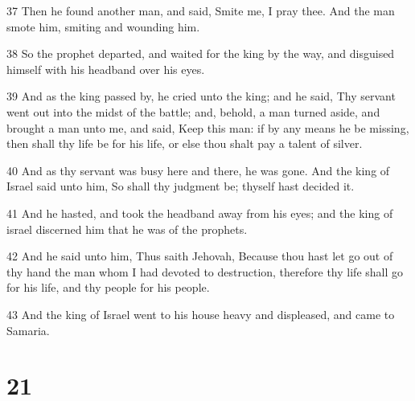 \par 37 Then he found another man, and said, Smite me, I pray thee. And the man smote him, smiting and wounding him.
\par 38 So the prophet departed, and waited for the king by the way, and disguised himself with his headband over his eyes.
\par 39 And as the king passed by, he cried unto the king; and he said, Thy servant went out into the midst of the battle; and, behold, a man turned aside, and brought a man unto me, and said, Keep this man: if by any means he be missing, then shall thy life be for his life, or else thou shalt pay a talent of silver.
\par 40 And as thy servant was busy here and there, he was gone. And the king of Israel said unto him, So shall thy judgment be; thyself hast decided it.
\par 41 And he hasted, and took the headband away from his eyes; and the king of israel discerned him that he was of the prophets.
\par 42 And he said unto him, Thus saith Jehovah, Because thou hast let go out of thy hand the man whom I had devoted to destruction, therefore thy life shall go for his life, and thy people for his people.
\par 43 And the king of Israel went to his house heavy and displeased, and came to Samaria.

\chapter{21}

